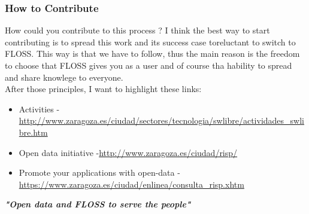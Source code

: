 \subsubsection{ How to Contribute} How could you contribute to this process ? I think the best way to start contributing is to spread this work and its success case to\nolinebreakpeople reluctant to switch to FLOSS. This way is that we have to follow, thus the main reason is the freedom to choose that FLOSS gives you as a user and of course tha hability to spread and share knowlege to everyone.
\\ After those principles, I want to highlight these links:
\\
\begin{itemize}
	\item Activities -\nolinebreak\href{http://www.zaragoza.es/ciudad/sectores/tecnologia/swlibre/actividades_swlibre.htm}{http://www.zaragoza.es/ciudad/sectores/tecnologia/swlibre/actividades\_swlibre.htm}
	\item Open data initiative -\nolinebreak\href{http://www.zaragoza.es/ciudad/risp/}{http://www.zaragoza.es/ciudad/risp/}
	\item Promote your applications with open-data -\nolinebreak\href{https://www.zaragoza.es/ciudad/enlinea/consulta_risp.xhtm}{https://www.zaragoza.es/ciudad/enlinea/consulta\_risp.xhtm}
\end{itemize}\textit{\textbf{"Open data and FLOSS to serve the people"}}